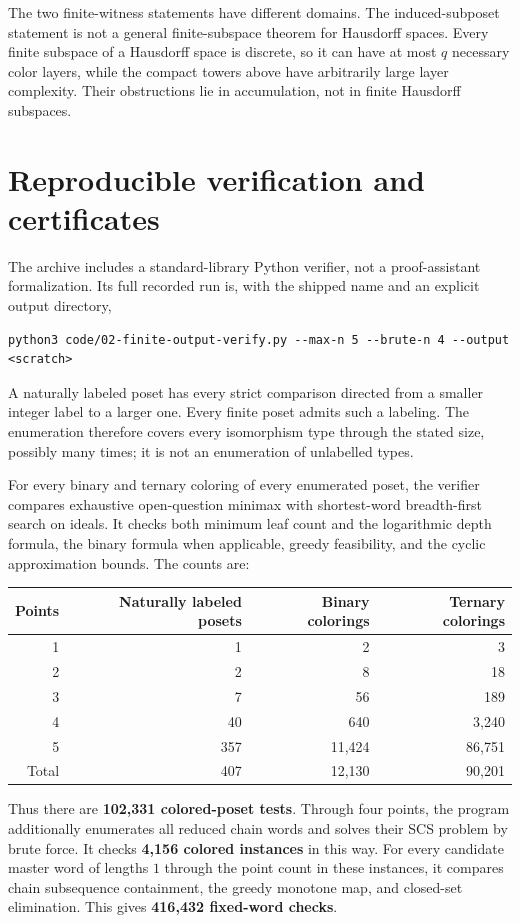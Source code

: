 \documentclass[11pt,letterpaper]{article}
\numberwithin{equation}{section}
\theoremstyle{definition}
\theoremstyle{remark}
\theoremstyle{definition}
\begin{document}
The two finite-witness statements have different domains. The induced-subposet
statement is not a general finite-subspace theorem for Hausdorff spaces. Every
finite subspace of a Hausdorff space is discrete, so it can have at most $q$
necessary color layers, while the compact towers above have arbitrarily large
layer complexity. Their obstructions lie in accumulation, not in finite
Hausdorff subspaces.

\section{Reproducible verification and certificates}
\label{fo:sec:verification}

The archive includes a standard-library Python verifier, not a proof-assistant
formalization. Its full recorded run is, with the shipped name and an explicit
output directory,
\begin{lstlisting}
python3 code/02-finite-output-verify.py --max-n 5 --brute-n 4 --output <scratch>
\end{lstlisting}
A naturally labeled poset has every strict comparison directed from a smaller
integer label to a larger one. Every finite poset admits such a labeling.
The enumeration therefore covers every isomorphism type through the stated
size, possibly many times; it is not an enumeration of unlabelled types.

For every binary and ternary coloring of every enumerated poset, the verifier
compares exhaustive open-question minimax with shortest-word breadth-first
search on ideals. It checks both minimum leaf count and the logarithmic depth
formula, the binary formula when applicable, greedy feasibility, and the cyclic
approximation bounds. The counts are:
\begin{center}
\begin{tabular}{@{}rrrr@{}}
\toprule
Points & Naturally labeled posets & Binary colorings & Ternary colorings\\
\midrule
1 & 1 & 2 & 3\\
2 & 2 & 8 & 18\\
3 & 7 & 56 & 189\\
4 & 40 & 640 & 3,240\\
5 & 357 & 11,424 & 86,751\\
\midrule
Total & 407 & 12,130 & 90,201\\
\bottomrule
\end{tabular}
\end{center}
Thus there are \textbf{102,331 colored-poset tests}. Through four points, the
program additionally enumerates all reduced chain words and solves their SCS
problem by brute force. It checks \textbf{4,156 colored instances} in this way.
For every candidate master word of lengths $1$ through the point count in these
instances, it compares chain subsequence containment, the greedy monotone map,
and closed-set elimination. This gives \textbf{416,432 fixed-word checks}.
\end{document}
